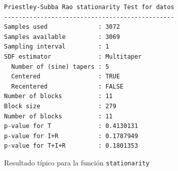 


\begin{figure}
\centering
\begin{lstlisting}[caption={}]
Priestley-Subba Rao stationarity Test for datos
-----------------------------------------------
Samples used              : 3072 
Samples available         : 3069 
Sampling interval         : 1 
SDF estimator             : Multitaper 
  Number of (sine) tapers : 5 
  Centered                : TRUE 
  Recentered              : FALSE 
Number of blocks          : 11 
Block size                : 279 
Number of blocks          : 11 
p-value for T             : 0.4130131 
p-value for I+R           : 0.1787949 
p-value for T+I+R         : 0.1801353 
\end{lstlisting}
\caption[{Resultado típico para la función \texttt{stationarity}}]
{Resultado típico para la función \texttt{stationarity}
}
\label{res_psr}
\end{figure}

